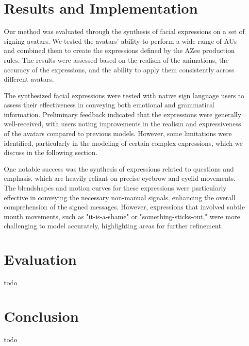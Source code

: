 \documentclass[../../main.tex]{subfiles}
\begin{document}
\section{Results and Implementation}
\label{ch:facial_expressions:results}

Our method was evaluated through the synthesis of facial expressions on a set of signing avatars. We tested the avatars' ability to perform a wide range of AUs and combined them to create the expressions defined by the AZee production rules. The results were assessed based on the realism of the animations, the accuracy of the expressions, and the ability to apply them consistently across different avatars.

The synthesized facial expressions were tested with native sign language users to assess their effectiveness in conveying both emotional and grammatical information. Preliminary feedback indicated that the expressions were generally well-received, with users noting improvements in the realism and expressiveness of the avatars compared to previous models. However, some limitations were identified, particularly in the modeling of certain complex expressions, which we discuss in the following section.

One notable success was the synthesis of expressions related to questions and emphasis, which are heavily reliant on precise eyebrow and eyelid movements. The blendshapes and motion curves for these expressions were particularly effective in conveying the necessary non-manual signals, enhancing the overall comprehension of the signed messages. However, expressions that involved subtle mouth movements, such as "it-is-a-shame" or "something-sticks-out," were more challenging to model accurately, highlighting areas for further refinement.

\section{Evaluation}
\label{ch:facial_expressions:evaluation}

todo

\section{Conclusion}
\label{ch:facial_expressions:conclusion}

todo
\end{document}
